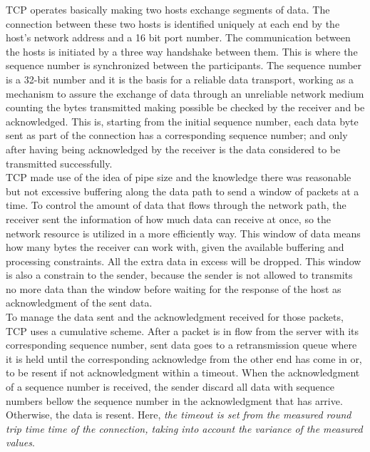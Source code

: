 TCP operates basically making two hosts exchange segments of data. The
connection between these two hosts is identified uniquely at each end by the
host's network address and a 16 bit port number. The communication between the
hosts is initiated by a three way handshake between them. This is where the
sequence number is synchronized between the participants. The sequence number
is a 32-bit number and it is the basis for a reliable data transport, working as
a mechanism to assure the exchange of data through an unreliable network
medium counting the bytes transmitted making possible be checked by the
receiver and be acknowledged. This is, starting from the initial sequence
number, each data byte sent as part of the connection has a corresponding
sequence number; and only after having being acknowledged by the receiver is
the data considered to be transmitted successfully.\\

TCP made use of the idea of pipe size and the knowledge there was reasonable
but not excessive buffering along the data path to send a window of packets at
a time. To control the amount of data that flows through the network path, the
receiver sent the information of how much data can receive at once, so the
network resource is utilized in a more efficiently way. This window of data
means how many bytes the receiver can work with, given the available buffering
and processing constraints. All the extra data in excess will be dropped. This
window is also a constrain to the sender, because the sender is not allowed to
transmits no more data than the window before waiting for the response of the
host as acknowledgment of the sent data.\\

To manage the data sent and the acknowledgment received for those packets, TCP
uses a cumulative scheme. After a packet is in flow from the server with its
corresponding sequence number, sent data goes to a retransmission queue where
it is held until the corresponding acknowledge from the other end has come in
or, to be resent if not acknowledgment within a timeout. When the
acknowledgment of a sequence number is received, the sender discard all data
with sequence numbers bellow the sequence number in the acknowledgment that
has arrive. Otherwise, the data is resent. Here, \textit{the timeout is set
from the measured round trip time time of the connection, taking into account
the variance of the measured values}\cite{JacobsonCAC}.\\

